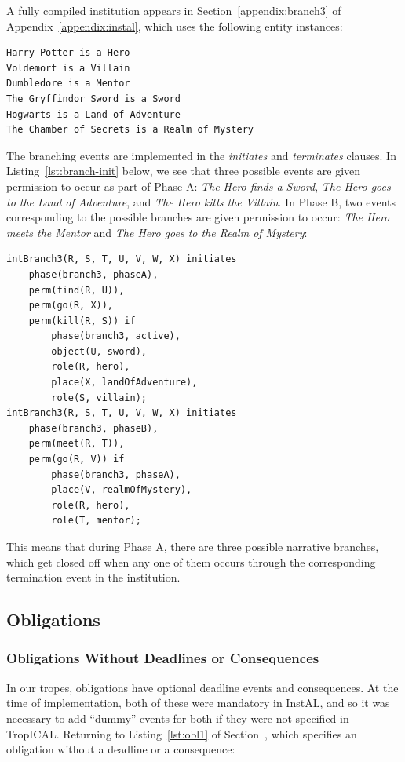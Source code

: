 \documentclass[11pt]{report}
\begin{document}
A fully compiled institution appears in Section~\ref{appendix:branch3} of
Appendix~\ref{appendix:instal}, which uses the following entity instances:

\begin{lstlisting}
Harry Potter is a Hero
Voldemort is a Villain
Dumbledore is a Mentor
The Gryffindor Sword is a Sword
Hogwarts is a Land of Adventure
The Chamber of Secrets is a Realm of Mystery
\end{lstlisting}

The branching events are implemented in the \emph{initiates} and
\emph{terminates} clauses. In Listing~\ref{lst:branch-init} below, we see that three possible events are given
permission to occur as part of Phase A: \emph{The Hero finds a Sword}, \emph{The
  Hero goes to the Land of Adventure}, and \emph{The Hero kills the Villain}. In
Phase B, two events corresponding to the possible branches are given permission
to occur: \emph{The Hero meets the Mentor} and \emph{The Hero goes to the Realm
  of Mystery}:

\begin{lstlisting}[label={lst:branch-init}, caption={Initiation events for the
branching trope in Listing~\ref{lst:branch3}}]
intBranch3(R, S, T, U, V, W, X) initiates
    phase(branch3, phaseA),
    perm(find(R, U)),
    perm(go(R, X)),
    perm(kill(R, S)) if
        phase(branch3, active),
        object(U, sword),
        role(R, hero),
        place(X, landOfAdventure),
        role(S, villain);
intBranch3(R, S, T, U, V, W, X) initiates
    phase(branch3, phaseB),
    perm(meet(R, T)),
    perm(go(R, V)) if
        phase(branch3, phaseA),
        place(V, realmOfMystery),
        role(R, hero),
        role(T, mentor);
\end{lstlisting}

This means that during Phase A, there are three possible narrative branches,
which get closed off when any one of them occurs through the corresponding
termination event in the institution.

\subsection{Obligations}
\label{sec:instal-obl}

\subsubsection{Obligations Without Deadlines or Consequences}
In our tropes, obligations have optional deadline events and consequences. At
the time of implementation, both of these were mandatory in InstAL, and so it
was necessary to add ``dummy'' events for both if they were not specified in TropICAL.
Returning to Listing~\ref{lst:obl1} of Section~\label{sec:obl-code}, which
specifies an obligation without a deadline or a consequence:
\end{document}
